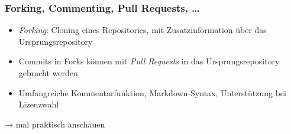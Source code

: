 \documentclass{cms-kurs}
\begin{document}
\begin{frame}
  \frametitle{Forking, Commenting, Pull Requests, …}

  \onslide<+->

  \begin{itemize}
  \item \emph{Forking}: Cloning eines Repositories, mit Zusatzinformation über
    das Ursprungsrepository
  \item Commits in Forks können mit \emph{Pull Requests} in das
    Ursprungsrepository gebracht werden
  \item Umfangreiche Kommentarfunktion, Markdown-Syntax, Unterstützung bei
    Lizenzwahl
  \end{itemize}

  \medskip{}

  → mal praktisch anschauen

\end{frame}
\end{document}

